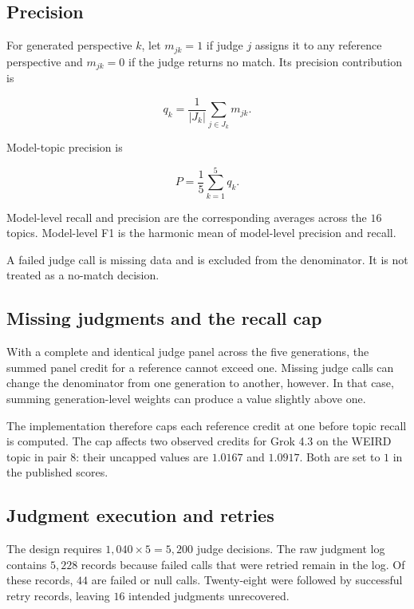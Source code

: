 \documentclass[11pt,a4paper]{article}
\begin{document}
\subsection{Precision}
\label{app:precision_aggregation}

For generated perspective $k$, let $m_{jk}=1$ if judge $j$ assigns it to any reference perspective and $m_{jk}=0$ if the judge returns no match. Its precision contribution is

\begin{equation}
 q_k=\frac{1}{|J_k|}\sum_{j\in J_k}m_{jk}.
\end{equation}

Model-topic precision is

\begin{equation}
 P=\frac{1}{5}\sum_{k=1}^{5}q_k.
\end{equation}

Model-level recall and precision are the corresponding averages across the $16$ topics. Model-level F1 is the harmonic mean of model-level precision and recall.

A failed judge call is missing data and is excluded from the denominator. It is not treated as a no-match decision.

\subsection{Missing judgments and the recall cap}
\label{app:missing_judgments}

With a complete and identical judge panel across the five generations, the summed panel credit for a reference cannot exceed one. Missing judge calls can change the denominator from one generation to another, however. In that case, summing generation-level weights can produce a value slightly above one.

The implementation therefore caps each reference credit at one before topic recall is computed. The cap affects two observed credits for Grok 4.3 on the WEIRD topic in pair $8$: their uncapped values are $1.0167$ and $1.0917$. Both are set to $1$ in the published scores.

\subsection{Judgment execution and retries}
\label{app:judgment_counts}

The design requires $1{,}040\times5=5{,}200$ judge decisions. The raw judgment log contains $5,228$ records because failed calls that were retried remain in the log. Of these records, $44$ are failed or null calls. Twenty-eight were followed by successful retry records, leaving $16$ intended judgments unrecovered.
\end{document}

